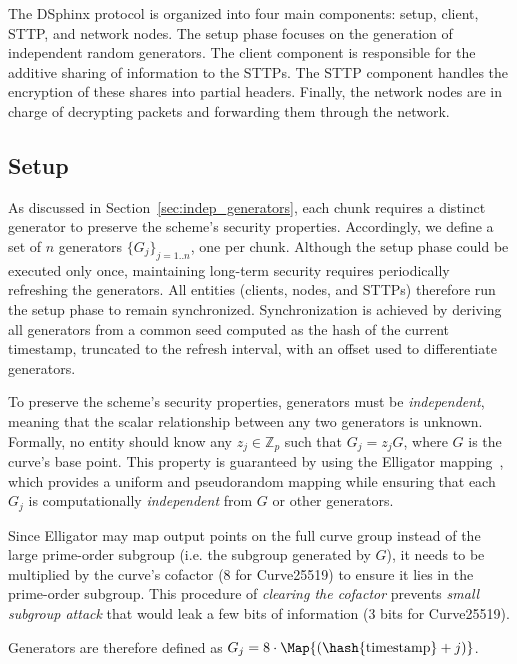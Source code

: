 The DSphinx protocol is organized into four main components: setup, client, STTP, and network nodes.
The setup phase focuses on the generation of independent random generators. 
The client component is responsible for the additive sharing of information to the STTPs. 
The STTP component handles the encryption of these shares into partial headers. 
Finally, the network nodes are in charge of decrypting packets and forwarding them through the network.

\subsection{Setup}

As discussed in Section~\ref{sec:indep_generators}, each chunk requires a distinct generator to preserve the scheme's security properties. 
Accordingly, we define a set of $n$ generators $\{G_j\}_{j=1..n}$, one per chunk.
Although the setup phase could be executed only once, maintaining long-term security requires periodically refreshing the generators. 
All entities (clients, nodes, and STTPs) therefore run the setup phase to remain synchronized. 
Synchronization is achieved by deriving all generators from a common seed computed as the hash of the current timestamp, truncated to the refresh interval, with an offset used to differentiate generators.

To preserve the scheme's security properties, generators must be \emph{independent}, meaning that the scalar relationship between any two generators is unknown. 
Formally, no entity should know any $z_j \in \mathbb{Z}_p$ such that $G_j = z_j G$, where $G$ is the curve's base point. 
This property is guaranteed by using the Elligator mapping~\cite{bernstein2013elligator}, which provides a uniform and pseudorandom mapping while ensuring that each $G_j$ is computationally \emph{independent} from $G$ or other generators.

Since Elligator may map output points on the full curve group instead of the large prime-order subgroup (i.e. the subgroup generated by $G$), 
it needs to be multiplied by the curve's cofactor (8 for Curve25519) to ensure it lies in the prime-order subgroup.
This procedure of \emph{clearing the cofactor} prevents \emph{small subgroup attack} that would leak a few bits of information (3 bits for Curve25519).

Generators are therefore defined as $ G_j = 8 \cdot \Map{(\hash{\text{timestamp}} + j)} $.

